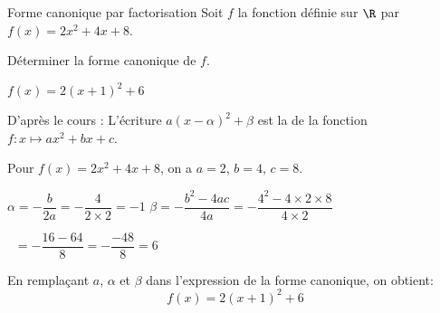 \begin{EXO}{Forme canonique par factorisation}{}
Soit $f$ la fonction définie sur $\R$ par $ f(x) = 2x^2+4x+8$.

 Déterminer la forme canonique de $f$.
\begin{crep}
$f(x) = 2(x+1)^2 + 6$
\end{crep}

\exocorrection

D'après le cours : 
L'écriture $a(x-\alpha)^{2} +\beta$ est la de la fonction $f:x\mapsto ax^{2} + bx + c$.

Pour $f(x) = 2x^2+4x+8$, on a $a=2$, $b=4$, $c=8$.

\begin{tcbenumerate}[2][1][alph]
    \tcbitem[halign=center] $\alpha = -\dfrac{b}{2a} = -\dfrac{4}{2 \times 2} = -1$
    \tcbitem[halign=center] $\beta = -\dfrac{b^2-4ac}{4a} = -\dfrac{4^2-4 \times 2 \times 8}{4 \times 2}$
    
    $\phantom{\beta}= -\dfrac{16-64}{8} = -\dfrac{-48}{8} = 6$
\end{tcbenumerate}

En remplaçant $a$, $\alpha$ et $\beta$  dans l'expression de la forme canonique, on obtient: 
$$f(x) = 2(x+1)^2 + 6$$
\end{EXO}